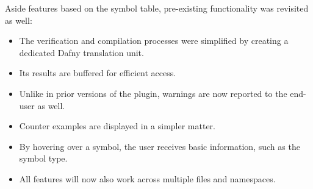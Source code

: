 Aside features based on the symbol table, pre-existing functionality was revisited as well:
\begin{itemize}
    \item The verification and compilation processes were simplified by creating a dedicated Dafny translation unit.
    \item Its results are buffered for efficient access.
    \item Unlike in prior versions of the plugin, warnings are now reported to the end-user as well.
    \item Counter examples are displayed in a simpler matter.
    \item By hovering over a symbol, the user receives basic information, such as the symbol type.
    \item All features will now also work across multiple files and namespaces.
\end{itemize}